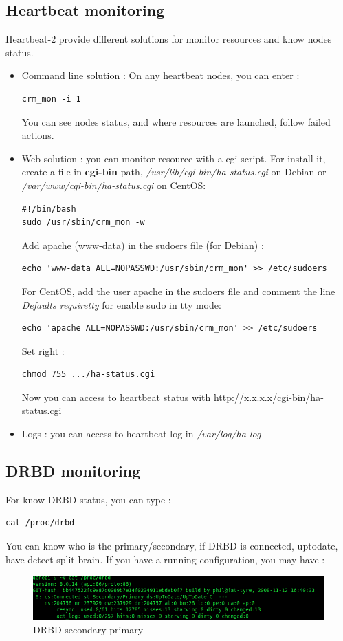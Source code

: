 \documentclass[a4paper,10pt]{report}
\begin{document}
\subsection{Heartbeat monitoring}
\label{hb-monitor}
Heartbeat-2 provide different solutions for monitor resources and know nodes status.
\begin{itemize}
 \item Command line solution : On any heartbeat nodes, you can enter :
\begin{lstlisting}
crm_mon -i 1
\end{lstlisting}
You can see nodes status, and where resources are launched, follow failed actions.
\item Web solution : you can monitor resource with a cgi script. For install it, create a file in \textbf{cgi-bin} path, \textit{/usr/lib/cgi-bin/ha-status.cgi} on Debian or \textit{/var/www/cgi-bin/ha-status.cgi} on CentOS:
\begin{lstlisting}
#!/bin/bash
sudo /usr/sbin/crm_mon -w
\end{lstlisting}
Add apache (www-data) in the sudoers file (for Debian) :
\begin{lstlisting}
echo 'www-data ALL=NOPASSWD:/usr/sbin/crm_mon' >> /etc/sudoers
\end{lstlisting}
For CentOS, add the user apache in the sudoers file and comment the line  \textit{Defaults  requiretty} for enable sudo in tty mode:
\begin{lstlisting}
echo 'apache ALL=NOPASSWD:/usr/sbin/crm_mon' >> /etc/sudoers
\end{lstlisting}
Set right :
\begin{lstlisting}
chmod 755 .../ha-status.cgi
\end{lstlisting}
Now you can access to heartbeat status with http://x.x.x.x/cgi-bin/ha-status.cgi
\item Logs : you can access to heartbeat log in \textit{/var/log/ha-log}

\end{itemize}


\subsection{DRBD monitoring}
For know DRBD status, you can type :
\begin{lstlisting}
cat /proc/drbd
\end{lstlisting}
You can know who is the primary/secondary, if DRBD is connected, uptodate, have detect split-brain. If you have a running configuration, you may have :
\begin{figure}[!h]
\begin{center}
\includegraphics[scale=0.5]{schema/drbd-s-p.png}
\end{center}
\caption{DRBD secondary primary} 
\label{hb-gui-2nodes} 
\end{figure}
\end{document}
